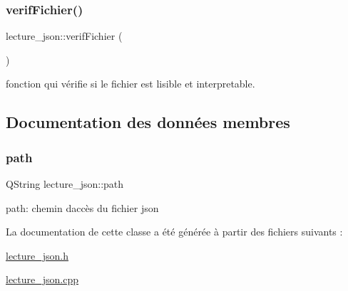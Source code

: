 \subsubsection{\texorpdfstring{verif\+Fichier()}{verifFichier()}}
{\footnotesize\ttfamily lecture\+\_\+json\+::verif\+Fichier (\begin{DoxyParamCaption}{ }\end{DoxyParamCaption})\hspace{0.3cm}{\ttfamily [private]}}



fonction qui vérifie si le fichier est lisible et interpretable. 



\subsection{Documentation des données membres}
\mbox{\label{classlecture__json_addfbc41d56e266180e4a120ba3cd1c61}} 
\subsubsection{\texorpdfstring{path}{path}}
{\footnotesize\ttfamily Q\+String lecture\+\_\+json\+::path\hspace{0.3cm}{\ttfamily [private]}}

path\+: chemin d\textquotesingle{}accès du fichier json 

La documentation de cette classe a été générée à partir des fichiers suivants \+:\begin{DoxyCompactItemize}
\item 
\hyperlink{lecture__json_8h}{lecture\+\_\+json.\+h}\item 
\hyperlink{lecture__json_8cpp}{lecture\+\_\+json.\+cpp}\end{DoxyCompactItemize}
